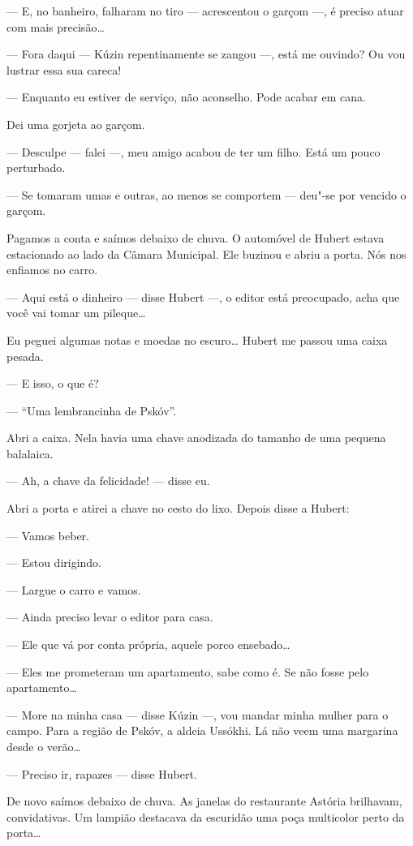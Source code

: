 --- E, no banheiro, falharam no tiro --- acrescentou o garçom ---, é
preciso atuar com mais precisão\ldots{}

--- Fora daqui --- Kúzin repentinamente se zangou ---, está me ouvindo?
Ou vou lustrar essa sua careca!

--- Enquanto eu estiver de serviço, não aconselho. Pode acabar em cana.

Dei uma gorjeta ao garçom.

--- Desculpe --- falei ---, meu amigo acabou de ter um filho. Está um
pouco perturbado.

--- Se tomaram umas e outras, ao menos se comportem --- deu"-se por
vencido o garçom.

Pagamos a conta e saímos debaixo de chuva. O automóvel de Hubert estava
estacionado ao lado da Câmara Municipal. Ele buzinou e abriu a porta.
Nós nos enfiamos no carro.

--- Aqui está o dinheiro --- disse Hubert ---, o editor está preocupado,
acha que você vai tomar um pileque\ldots{}

Eu peguei algumas notas e moedas no escuro\ldots{} Hubert me passou uma caixa
pesada.

--- E isso, o que é?

--- ``Uma lembrancinha de Pskóv''.

Abri a caixa. Nela havia uma chave anodizada do tamanho de uma pequena
balalaica.

--- Ah, a chave da felicidade! --- disse eu.

Abri a porta e atirei a chave no cesto do lixo. Depois disse a Hubert:

--- Vamos beber.

--- Estou dirigindo.

--- Largue o carro e vamos.

--- Ainda preciso levar o editor para casa.

--- Ele que vá por conta própria, aquele porco ensebado\ldots{}

--- Eles me prometeram um apartamento, sabe como é. Se não fosse pelo
apartamento\ldots{}

--- More na minha casa --- disse Kúzin ---, vou mandar minha mulher para
o campo. Para a região de Pskóv, a aldeia Ussókhi. Lá não veem uma
margarina desde o verão\ldots{}

--- Preciso ir, rapazes --- disse Hubert.

De novo saímos debaixo de chuva. As janelas do restaurante Astória
brilhavam, convidativas. Um lampião destacava da escuridão uma poça
multicolor perto da porta\ldots{}

